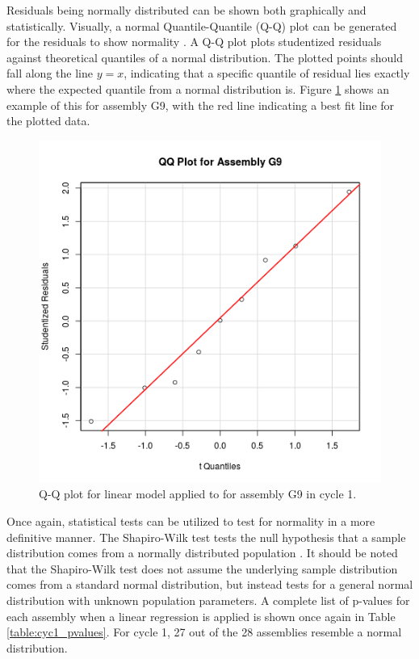 \documentclass{article}
\begin{document}
Residuals being normally distributed can be shown both graphically and statistically. Visually, a normal Quantile-Quantile (Q-Q) plot can be generated for the residuals to show normality \cite{faraway2014linear}. A Q-Q plot plots studentized residuals against theoretical quantiles of a normal distribution. The plotted points should fall along the line $y=x$, indicating that a specific quantile of residual lies exactly where the expected quantile from a normal distribution is. Figure \ref{fig:lm_G9_qq} shows an example of this for assembly G9, with the red line indicating a best fit line for the plotted data.

\begin{figure}[!htb]
\centering
\includegraphics[keepaspectratio, width = 3.5 in]{figures/G9_qq.png}
\caption{Q-Q plot for linear model applied to for assembly G9 in cycle 1.}
\label{fig:lm_G9_qq}
\end{figure}

Once again, statistical tests can be utilized to test for normality in a more definitive manner. The Shapiro-Wilk test tests the null hypothesis that a sample distribution comes from a normally distributed population \cite{royston1982algorithm,royston1995remark,faraway2014linear}. It should be noted that the Shapiro-Wilk test does not assume the underlying sample distribution comes from a standard normal distribution, but instead tests for a general normal distribution with unknown population parameters. A complete list of p-values for each assembly when a linear regression is applied is shown once again in Table \ref{table:cyc1_pvalues}. For cycle 1, 27 out of the 28 assemblies resemble a normal distribution.
\end{document}
